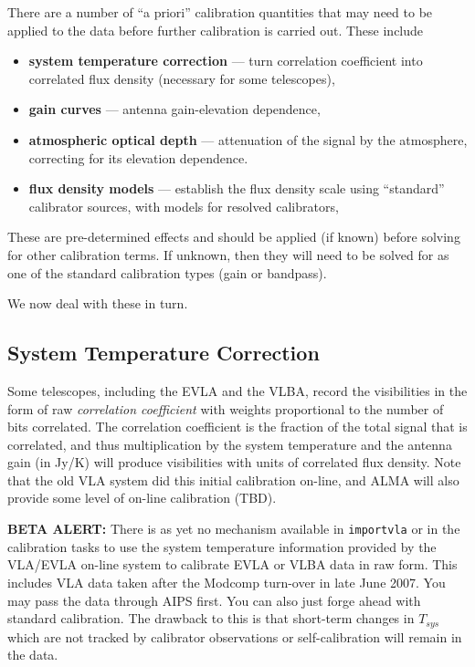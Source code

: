 There are a number of ``a priori'' calibration quantities that
may need to be applied to the data before further calibration
is carried out.  These include
\begin{itemize}
   \item {\bf system temperature correction} --- turn correlation
      coefficient into correlated flux density (necessary for some
      telescopes),
   \item {\bf gain curves} --- antenna gain-elevation dependence,
   \item {\bf atmospheric optical depth} --- attenuation of the signal
      by the atmosphere, correcting for its elevation dependence.
   \item {\bf flux density models} --- establish the flux density
      scale using ``standard'' calibrator sources, with models for
      resolved calibrators,
\end{itemize}
These are pre-determined effects and should be applied (if known) before
solving for other calibration terms.  If unknown, then they will
need to be solved for as one of the standard calibration types
(gain or bandpass).

We now deal with these in turn.

\subsection{System Temperature Correction}
\label{section:cal.prior.tsys}

Some telescopes, including the EVLA and the VLBA, record the
visibilities in the form of raw {\it correlation coefficient} 
with weights proportional to the number of bits correlated.
The correlation coefficient is the fraction of the total signal
that is correlated, and thus multiplication by the system temperature
and the antenna gain (in Jy/K) will produce visibilities with
units of correlated flux density.  Note that the old VLA system did
this initial calibration on-line, and ALMA will also provide some
level of on-line calibration (TBD).

{\bf BETA ALERT:} There is as yet no mechanism available in {\tt importvla}
or in the calibration tasks to use the system temperature information
provided by the VLA/EVLA on-line system to calibrate EVLA or VLBA data
in raw form.  This includes VLA data taken after the Modcomp turn-over
in late June 2007.  You may pass the data through AIPS first.  You can
also just forge ahead with standard calibration.  The drawback to this
is that short-term changes in $T_{sys}$ which are not tracked by
calibrator observations or self-calibration will remain in the data.

